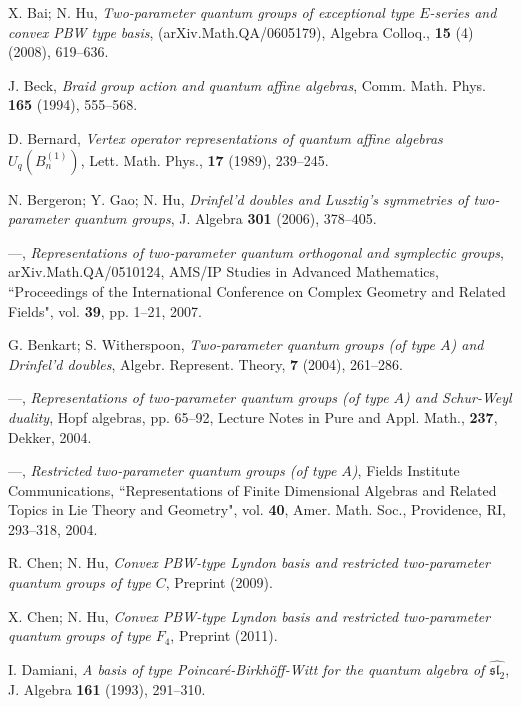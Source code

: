\documentclass{amsproc}
\theoremstyle{remark}
\numberwithin{equation}{section}
\begin{document}
\begin{thebibliography}{15}

 X. Bai; N. Hu, \textit{Two-parameter quantum groups of exceptional type
$E$-series and convex \textrm{PBW} type basis},
(arXiv.Math.QA/0605179), Algebra Colloq.,
 \textbf{15} (4) (2008), 619--636.

 J. Beck, \textit{Braid group action and quantum affine
algebras}, Comm. Math. Phys. \textbf {165} (1994), 555--568.

 D. Bernard,  \textit{Vertex operator representations
of quantum affine algebras $U_q({B^{(1)}_n})$}, Lett. Math. Phys.,
\textbf {17} (1989), 239--245.

 N. Bergeron; Y. Gao; N. Hu, \textit{Drinfel'd doubles and Lusztig's symmetries
 of two-parameter quantum groups},  J. Algebra \textbf{301} (2006), 378--405.

 ---, \textit{Representations of
two-parameter quantum orthogonal and symplectic groups},
arXiv.Math.QA/0510124, AMS/IP Studies in Advanced Mathematics,
``Proceedings of the International Conference on Complex Geometry
and Related Fields", vol. \textbf{39}, pp. 1--21, 2007.

 G. Benkart; S. Witherspoon, \textit{Two-parameter quantum groups (of type $A$) and
Drinfel'd doubles}, Algebr. Represent. Theory, \textbf{7} (2004),
261--286.

 ---, \textit{Representations of two-parameter quantum
groups (of type $A$) and Schur-Weyl duality}, Hopf algebras, pp.
65--92, Lecture Notes in Pure and Appl. Math., \textbf{237}, Dekker,
2004.

 ---, \textit{Restricted two-parameter quantum groups (of type $A$)},
Fields Institute Communications, ``Representations of Finite
Dimensional Algebras and Related Topics in Lie Theory and Geometry",
vol. \textbf{40}, Amer. Math. Soc., Providence, RI, 293--318, 2004.

 R. Chen; N. Hu, \textit{Convex PBW-type Lyndon basis
and restricted two-parameter quantum groups of type $C$}, Preprint
(2009).

 X. Chen; N. Hu, \textit{Convex PBW-type Lyndon basis
and restricted two-parameter quantum groups of type $F_4$}, Preprint
(2011).

 I. Damiani, \textit{A basis of type Poincar\'e-Birkh\"off-Witt for the quantum algebra of $\widehat{\mathfrak{sl}_2}$}, J. Algebra \textbf{161} (1993), 291--310.


\end{thebibliography}
\end{document}
